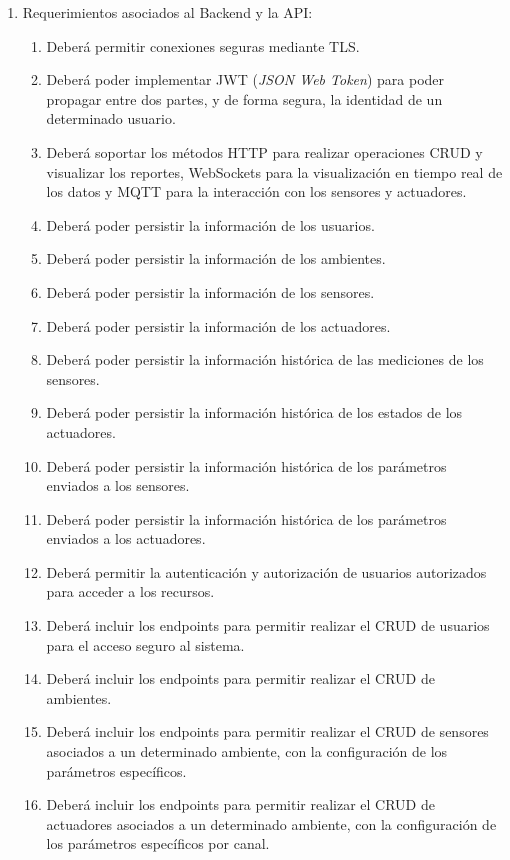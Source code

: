 \begin{enumerate}
	\item Requerimientos asociados al Backend y la API:
	      \begin{enumerate}
		      \item Deberá permitir conexiones seguras mediante TLS.
		      \item Deberá poder implementar JWT (\textit{JSON Web Token}) para poder propagar entre dos partes, y de forma segura, la identidad de un 
			  determinado usuario.
		      \item Deberá soportar los métodos HTTP para realizar operaciones CRUD y visualizar los reportes, WebSockets
		            para la visualización en tiempo real de los datos y MQTT para la interacción con los sensores y actuadores.
			  \item Deberá poder persistir la información de los usuarios.
			  \item Deberá poder persistir la información de los ambientes.
			  \item Deberá poder persistir la información de los sensores.
			  \item Deberá poder persistir la información de los actuadores.
			  \item Deberá poder persistir la información histórica de las mediciones de los sensores.
			  \item Deberá poder persistir la información histórica de los estados de los actuadores.
			  \item Deberá poder persistir la información histórica de los parámetros enviados a los sensores.
			  \item Deberá poder persistir la información histórica de los parámetros enviados a los actuadores.
		      \item Deberá permitir la autenticación y autorización de usuarios autorizados para acceder a los recursos.
		      \item Deberá incluir los endpoints para permitir realizar el CRUD de usuarios para el acceso seguro al sistema.
		      \item Deberá incluir los endpoints para permitir realizar el CRUD de ambientes.
		      \item Deberá incluir los endpoints para permitir realizar el CRUD de sensores asociados a un determinado ambiente, 
			  con la configuración de los parámetros específicos.
		      \item Deberá incluir los endpoints para permitir realizar el CRUD de actuadores asociados a un determinado ambiente, 
			  con la configuración de los parámetros específicos por canal.

\end{enumerate}
\end{enumerate}
